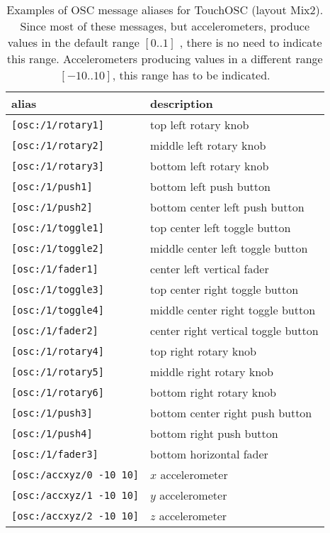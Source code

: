 \begin{table}[htdp]
\begin{center}
\begin{tabular}{|l|l|}
\hline
\bf{alias} 	& \bf{description}	\\
\hline
\lstinline'[osc:/1/rotary1]' & top left rotary knob\\
\lstinline'[osc:/1/rotary2]' & middle left rotary knob\\
\lstinline'[osc:/1/rotary3]' & bottom left rotary knob\\
\lstinline'[osc:/1/push1]' & bottom left push button\\
\lstinline'[osc:/1/push2]' & bottom center left push button\\
\hline
\lstinline'[osc:/1/toggle1]' & top center left toggle button\\
\lstinline'[osc:/1/toggle2]' & middle center left toggle button\\
\lstinline'[osc:/1/fader1]' & center left vertical fader\\
\hline
\lstinline'[osc:/1/toggle3]' & top center right toggle button\\
\lstinline'[osc:/1/toggle4]' & middle center right toggle button\\
\lstinline'[osc:/1/fader2]' & center right vertical toggle button\\
\hline
\lstinline'[osc:/1/rotary4]' & top right rotary knob\\
\lstinline'[osc:/1/rotary5]' & middle right rotary knob\\
\lstinline'[osc:/1/rotary6]' & bottom right rotary knob\\
\lstinline'[osc:/1/push3]' & bottom center right push button\\
\lstinline'[osc:/1/push4]' & bottom right push button\\
\hline
\lstinline'[osc:/1/fader3]' & bottom horizontal fader\\
\hline
\lstinline'[osc:/accxyz/0 -10 10]' &  $x$ accelerometer\\
\lstinline'[osc:/accxyz/1 -10 10]' &  $y$ accelerometer\\
\lstinline'[osc:/accxyz/2 -10 10]' &  $z$ accelerometer\\
\hline
\end{tabular}
\end{center}
\caption{Examples of OSC message aliases for TouchOSC (layout Mix2). Since most of these messages, but accelerometers, produce values in the default range $[0..1]$ , there is no need to indicate this range. Accelerometers producing values in a different range $[-10..10]$, this range has to be indicated. }
\label{tab:oscalias}
\end{table}


